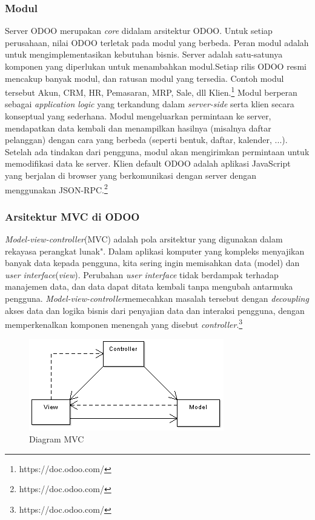 \subsubsection{Modul}

Server ODOO merupakan \textit{core} didalam arsitektur ODOO. Untuk setiap perusahaan, nilai  ODOO terletak pada modul yang berbeda. Peran modul adalah untuk mengimplementasikan kebutuhan bisnis. Server adalah satu-satunya komponen yang diperlukan untuk menambahkan modul.Setiap rilis  ODOO resmi mencakup banyak modul, dan ratusan modul yang tersedia. Contoh modul tersebut Akun, CRM, HR, Pemasaran, MRP, Sale, dll
Klien.\footnote{https://doc.odoo.com/}
Modul berperan sebagai \textit{application logic} yang terkandung dalam \textit{server-side} serta klien secara konseptual yang sederhana. Modul mengeluarkan permintaan ke server, mendapatkan data kembali dan menampilkan hasilnya (misalnya daftar pelanggan) dengan cara yang berbeda (seperti bentuk, daftar, kalender, ...). Setelah ada tindakan dari pengguna, modul akan mengirimkan permintaan untuk memodifikasi data ke server.
Klien default  ODOO adalah aplikasi JavaScript yang berjalan di browser yang berkomunikasi dengan server dengan menggunakan JSON-RPC.\footnote{https://doc.odoo.com/}

\subsubsection{Arsitektur MVC di ODOO}
\textit{Model-view-controller}(MVC) adalah pola arsitektur yang digunakan dalam rekayasa perangkat lunak". Dalam aplikasi komputer yang kompleks menyajikan banyak data kepada pengguna, kita sering ingin memisahkan data (model) dan \textit{user interface}(\textit{view}). Perubahan \textit{user interface} tidak berdampak terhadap manajemen data, dan data dapat ditata kembali tanpa mengubah antarmuka pengguna. \textit{Model-view-controller}memecahkan masalah tersebut dengan \textit{decoupling} akses data dan logika bisnis dari penyajian data dan interaksi pengguna, dengan memperkenalkan komponen menengah yang disebut \textit{controller}.\footnote{https://doc.odoo.com/}
 
\begin{figure}[h]
	\centering
	\includegraphics[scale=1]{Gambar/DiagramMVC}
	\caption{Diagram MVC}
	\end{figure}

